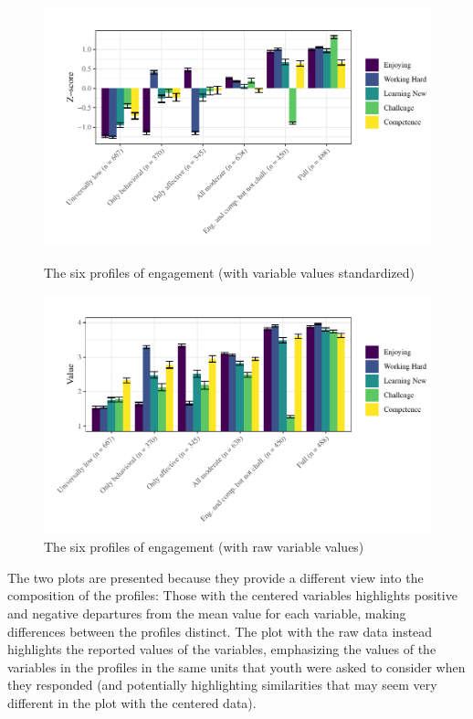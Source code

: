 \documentclass[]{msu-thesis}
\theoremstyle{definition}
\theoremstyle{definition}
\theoremstyle{definition}
\theoremstyle{remark}
\begin{document}
\begin{figure}

{\centering \includegraphics[width=1\linewidth]{rosenberg-dissertation_files/figure-latex/unnamed-chunk-12-1}

}

\caption{The six profiles of engagement (with variable values standardized)}\label{fig:unnamed-chunk-12}

{\centering \includegraphics[width=1\linewidth]{rosenberg-dissertation_files/figure-latex/unnamed-chunk-13-1}

}

\caption{The six profiles of engagement (with raw variable values)}\label{fig:unnamed-chunk-13}
\end{figure}

The two plots are presented because they provide a different view into
the composition of the profiles: Those with the centered variables
highlights positive and negative departures from the mean value for each
variable, making differences between the profiles distinct. The plot
with the raw data instead highlights the reported values of the
variables, emphasizing the values of the variables in the profiles in
the same units that youth were asked to consider when they responded
(and potentially highlighting similarities that may seem very different
in the plot with the centered data).
\end{document}
